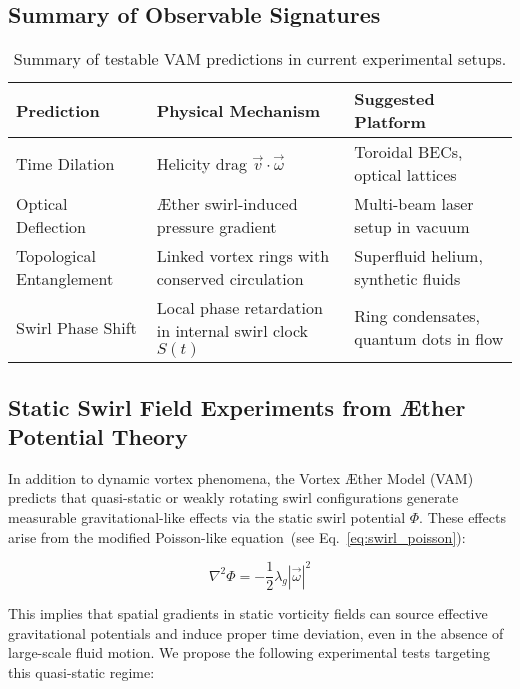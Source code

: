 \documentclass[preprint]{revtex4-2}
\begin{document}
            \subsection*{Summary of Observable Signatures}
            \begin{table}[H]
                \centering
                \footnotesize
                \begin{tabular}{|p{3.5cm}|p{4.8cm}|p{5.0cm}|}
                    \hline
                    \textbf{Prediction} & \textbf{Physical Mechanism} & \textbf{Suggested Platform} \\
                    \hline
                    Time Dilation & Helicity drag \( \vec{v} \cdot \vec{\omega} \) & Toroidal BECs, optical lattices \\
                    \hline
                    Optical Deflection & Æther swirl-induced pressure gradient & Multi-beam laser setup in vacuum \\
                    \hline
                    Topological Entanglement & Linked vortex rings with conserved circulation & Superfluid helium, synthetic fluids \\
                    \hline
                    Swirl Phase Shift & Local phase retardation in internal swirl clock \( S(t) \) & Ring condensates, quantum dots in flow \\
                    \hline
                \end{tabular}
                \caption{Summary of testable VAM predictions in current experimental setups.}
            \end{table}
        
            \subsection{Static Swirl Field Experiments from Æther Potential Theory}
            In addition to dynamic vortex phenomena, the Vortex \AE{}ther Model (VAM) predicts that quasi-static or weakly rotating swirl configurations generate measurable gravitational-like effects via the static swirl potential \( \Phi \). These effects arise from the modified Poisson-like equation~(see Eq.~\ref{eq:swirl_poisson}):
        
            \begin{equation}
                \nabla^2 \Phi = -\frac{1}{2} \lambda_g |\vec{\omega}|^2
            \end{equation}
        
            This implies that spatial gradients in static vorticity fields can source effective gravitational potentials and induce proper time deviation, even in the absence of large-scale fluid motion. We propose the following experimental tests targeting this quasi-static regime:
        
\end{document}
